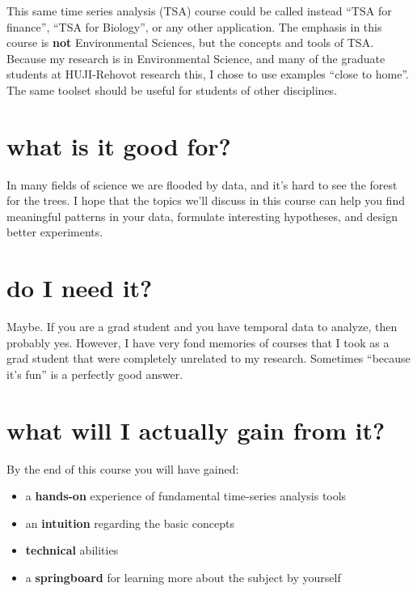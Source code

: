 \documentclass[
  letterpaper,
  DIV=11,
  numbers=noendperiod]{scrreprt}
\providecommand{\tightlist}{%
  \setlength{\itemsep}{0pt}\setlength{\parskip}{0pt}}\usepackage{longtable,booktabs,array}
\begin{document}

This same time series analysis (TSA) course could be called instead
``TSA for finance'', ``TSA for Biology'', or any other application. The
emphasis in this course is \textbf{not} Environmental Sciences, but the
concepts and tools of TSA. Because my research is in Environmental
Science, and many of the graduate students at HUJI-Rehovot research
this, I chose to use examples ``close to home''. The same toolset should
be useful for students of other disciplines.

\section*{what is it good for?}\label{what-is-it-good-for}


In many fields of science we are flooded by data, and it's hard to see
the forest for the trees. I hope that the topics we'll discuss in this
course can help you find meaningful patterns in your data, formulate
interesting hypotheses, and design better experiments.

\section*{do I need it?}\label{do-i-need-it}


Maybe. If you are a grad student and you have temporal data to analyze,
then probably yes. However, I have very fond memories of courses that I
took as a grad student that were completely unrelated to my research.
Sometimes ``because it's fun'' is a perfectly good answer.

\section*{\texorpdfstring{what will I \textbf{actually} gain from
it?}{what will I actually gain from it?}}\label{what-will-i-actually-gain-from-it}


By the end of this course you will have gained:

\begin{itemize}
\tightlist
\item
  a \textbf{hands-on} experience of fundamental time-series analysis
  tools
\item
  an \textbf{intuition} regarding the basic concepts
\item
  \textbf{technical} abilities
\item
  a \textbf{springboard} for learning more about the subject by yourself
\end{itemize}
\end{document}
